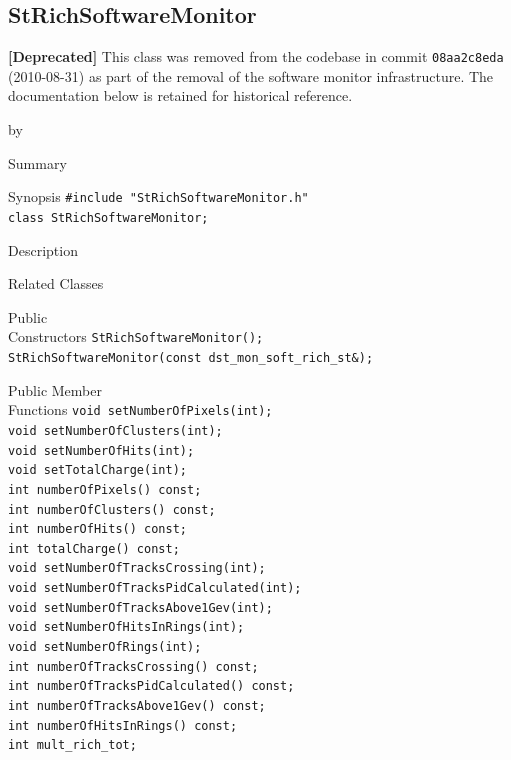 \documentclass[twoside]{article}
\newcommand{\entrylabel}[1]{\mbox{\textbf{{#1}}}\hfil}%
\newenvironment{entry}
{\begin{list}{}%
    {\renewcommand{\makelabel}{\entrylabel}%
     \setlength{\labelwidth}{90pt}%
     \setlength{\leftmargin}{\labelwidth}
     \advance\leftmargin by \labelsep%
      }%
    }%
  {\end{list}}
\newcommand{\Entrylabel}[1]%
{\raisebox{0pt}[1ex][0pt]{\makebox[\labelwidth][l]%
    {\parbox[t]{\labelwidth}{\hspace{0pt}\textbf{{#1}}}}}}
\newenvironment{Entry}%
{\renewcommand{\entrylabel}{\Entrylabel}\begin{entry}}%
  {\end{entry}}
\begin{document}
\subsection{StRichSoftwareMonitor}
\label{sec:StRichSoftwareMonitor}
\textbf{[Deprecated]} This class was removed from the codebase in commit
\texttt{08aa2c8eda} (2010-08-31) as part of the removal of the software monitor
infrastructure.
The documentation below is retained for historical reference.

\begin{Entry}
\item[Summary]
\item[Synopsis]
    \verb+#include "StRichSoftwareMonitor.h"+\\
    \verb+class StRichSoftwareMonitor;+\\
\item[Description]
\item[Related Classes]
\item[Public\\ Constructors]
    \verb+StRichSoftwareMonitor();+\\
    \verb+StRichSoftwareMonitor(const dst_mon_soft_rich_st&);+\\
\item[Public Member\\ Functions]
    \verb+void setNumberOfPixels(int);+\\
    \verb+void setNumberOfClusters(int);+\\
    \verb+void setNumberOfHits(int);+\\
    \verb+void setTotalCharge(int);+\\
    \verb+int numberOfPixels() const;+\\
    \verb+int numberOfClusters() const;+\\
    \verb+int numberOfHits() const;+\\
    \verb+int totalCharge() const;+\\
    \verb+void setNumberOfTracksCrossing(int);+\\
    \verb+void setNumberOfTracksPidCalculated(int);+\\
    \verb+void setNumberOfTracksAbove1Gev(int);+\\
    \verb+void setNumberOfHitsInRings(int);+\\
    \verb+void setNumberOfRings(int);+\\
    \verb+int numberOfTracksCrossing() const;+\\
    \verb+int numberOfTracksPidCalculated() const;+\\
    \verb+int numberOfTracksAbove1Gev() const;+\\
    \verb+int numberOfHitsInRings() const;+\\
    \verb+int mult_rich_tot;+\\
\end{Entry}
\clearpage
\end{document}
